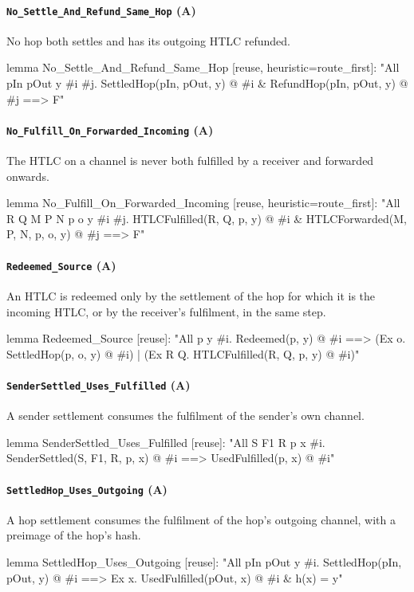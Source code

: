 \paragraph{\texttt{No\_Settle\_And\_Refund\_Same\_Hop} (A)}
No hop both settles and has its outgoing HTLC refunded.
\begin{spthy}
lemma No_Settle_And_Refund_Same_Hop [reuse, heuristic={route_first}]:
    "All pIn pOut y #i #j. SettledHop(pIn, pOut, y) @ #i & RefundHop(pIn, pOut, y) @ #j ==> F"
\end{spthy}

\paragraph{\texttt{No\_Fulfill\_On\_Forwarded\_Incoming} (A)}
The HTLC on a channel is never both fulfilled by a receiver and forwarded onwards.
\begin{spthy}
lemma No_Fulfill_On_Forwarded_Incoming [reuse, heuristic={route_first}]:
    "All R Q M P N p o y #i #j.
        HTLCFulfilled(R, Q, p, y) @ #i & HTLCForwarded(M, P, N, p, o, y) @ #j ==> F"
\end{spthy}

\paragraph{\texttt{Redeemed\_Source} (A)}
An HTLC is redeemed only by the settlement of the hop for which it is the incoming HTLC, or by
the receiver's fulfilment, in the same step.
\begin{spthy}
lemma Redeemed_Source [reuse]:
    "All p y #i. Redeemed(p, y) @ #i
     ==> (Ex o. SettledHop(p, o, y) @ #i)
       | (Ex R Q. HTLCFulfilled(R, Q, p, y) @ #i)"
\end{spthy}

\paragraph{\texttt{SenderSettled\_Uses\_Fulfilled} (A)}
A sender settlement consumes the fulfilment of the sender's own channel.
\begin{spthy}
lemma SenderSettled_Uses_Fulfilled [reuse]:
    "All S F1 R p x #i. SenderSettled(S, F1, R, p, x) @ #i ==> UsedFulfilled(p, x) @ #i"
\end{spthy}

\paragraph{\texttt{SettledHop\_Uses\_Outgoing} (A)}
A hop settlement consumes the fulfilment of the hop's outgoing channel, with a preimage of the
hop's hash.
\begin{spthy}
lemma SettledHop_Uses_Outgoing [reuse]:
    "All pIn pOut y #i. SettledHop(pIn, pOut, y) @ #i
     ==> Ex x. UsedFulfilled(pOut, x) @ #i & h(x) = y"
\end{spthy}

